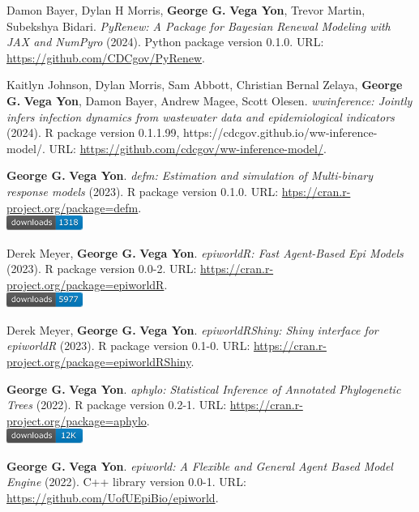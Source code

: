 \item Damon Bayer, Dylan H Morris, \textbf{George G.} \textbf{Vega Yon}, Trevor Martin, Subekshya Bidari. \textit{{PyRenew}: A Package for Bayesian Renewal Modeling with {JAX} and {NumPyro}} (2024). Python package version 0.1.0. {\small URL}: \url{https://github.com/CDCgov/PyRenew}.  
\item Kaitlyn Johnson, Dylan Morris, Sam Abbott, Christian Bernal Zelaya, \textbf{George G.} \textbf{Vega Yon}, Damon Bayer, Andrew Magee, Scott Olesen. \textit{wwinference: Jointly infers infection dynamics from wastewater data and epidemiological indicators} (2024). R package version 0.1.1.99, https://cdcgov.github.io/ww-inference-model/. {\small URL}: \url{https://github.com/cdcgov/ww-inference-model/}.  
\item \textbf{George G.} \textbf{Vega Yon}. \textit{defm: Estimation and simulation of Multi-binary response models} (2023). R package version 0.1.0. {\small URL}: \url{htps://cran.r-project.org/package=defm}. \\\includegraphics[width=2.5cm]{fig/cran-downloads-defm.pdf} 
\item Derek Meyer, \textbf{George G.} \textbf{Vega Yon}. \textit{epiworldR: Fast Agent-Based Epi Models} (2023). R package version 0.0-2. {\small URL}: \url{https://cran.r-project.org/package=epiworldR}. \\\includegraphics[width=2.5cm]{fig/cran-downloads-epiworldr.pdf} 
\item Derek Meyer, \textbf{George G.} \textbf{Vega Yon}. \textit{epiworldRShiny: Shiny interface for epiworldR} (2023). R package version 0.1-0. {\small URL}: \url{https://cran.r-project.org/package=epiworldRShiny}.  
\item \textbf{George G.} \textbf{Vega Yon}. \textit{aphylo: Statistical Inference of Annotated Phylogenetic Trees} (2022). R package version 0.2-1. {\small URL}: \url{https://cran.r-project.org/package=aphylo}. \\\includegraphics[width=2.5cm]{fig/cran-downloads-aphylo.pdf} 
\item \textbf{George G.} \textbf{Vega Yon}. \textit{{epiworld}: A Flexible and General Agent Based Model Engine} (2022). C++ library version 0.0-1. {\small URL}: \url{https://github.com/UofUEpiBio/epiworld}.  
